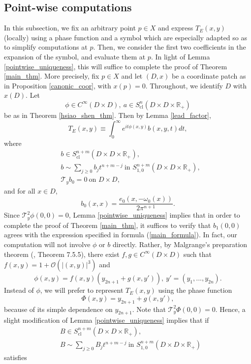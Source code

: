 \documentclass{article}
\newcommand{\RR}{\mathbb R}
\newcommand{\mct}{\mathcal T}
\newcommand{\mco}{\mathcal O}
\DeclareMathOperator{\cl}{cl}
\begin{document}
\subsection{Point-wise computations}
In this subsection, we fix an arbitrary point $p\in X$ and express $T_E(x,y)$ (locally) using a phase function and a symbol which are especially adapted so as to simplify computations at $p$. Then, we consider the first two coefficients in the expansion of the symbol, and evaluate them at $p$. In light of Lemma \ref{pointwise_uniqueness}, this will suffice to complete the proof of Theorem \ref{main_thm}. More precisely, fix $p \in X$ and let $(D, x)$ be a coordinate patch as in Proposition \ref{canonic_coor}, with $x(p) = 0$. Throughout, we identify $D$ with $x(D)$. Let $$\phi \in C^\infty(D \times D),\ a \in S^n_{\cl}(D \times D \times \RR_+)$$ be as in Theorem \ref{hsiao_shen_thm}. Then by Lemma \ref{lead_factor}, $$T_E(x,y) \equiv \int_0^\infty e^{it \phi(x,y)} b(x,y,t)dt,$$
where $$\begin{aligned} &b\in S^{n+m}_{\cl}(D \times D \times \RR_+),\\ &b \sim \sum_{j \ge 0} b_j t^{n+m-j}\ \text{in }S^{n+m}_{1,0}(D \times D \times \RR_+),\\ &\mct_y b_0 = 0\ \text{on }D \times D,\end{aligned}$$ and for all $x \in D$, $$b_0(x,x) = \frac{e_0(x, -\omega_0(x))}{2\pi^{n+1}}.$$
%
Since $\mct_y^2 \phi(0,0) = 0$, Lemma \ref{pointwise_uniqueness} implies that in order to complete the proof of Theorem \ref{main_thm}, it suffices to verify that $b_1(0,0)$ agrees with the expression specified in formula (\ref{main_formula}). In fact, our computation will not involve $\phi$ or $b$ directly. Rather, by Malgrange's preparation theorem (\cite{hormander1}, Theorem 7.5.5), there exist $f, g \in C^\infty(D \times D)$ such that $f(x,y) = 1 + \mco(|(x,y)|^3)$ and $$\phi(x,y) = f(x,y)(y_{2n+1} + g(x,y')),\ y' = (y_1,...,y_{2n}).$$
Instead of $\phi$, we will prefer to represent $T_E(x,y)$ using the phase function \begin{equation}\label{loc_indep_phase}\Phi(x,y) = y_{2n+1} + g(x,y'),\end{equation} because of its simple dependence on $y_{2n+1}$. Note that $\mct_y^2 \Phi(0,0) = 0$. Hence, a slight modification of Lemma \ref{pointwise_uniqueness} implies that if $$\begin{aligned} &B \in S^{n+m}_{\cl}(D \times D \times \RR_+),\\ & B \sim \sum_{j \ge 0} B_j t^{n+m-j}\ \text{in } S^{n+m}_{1,0}(D \times D \times \RR_+) \end{aligned}$$ satisfies
\end{document}
